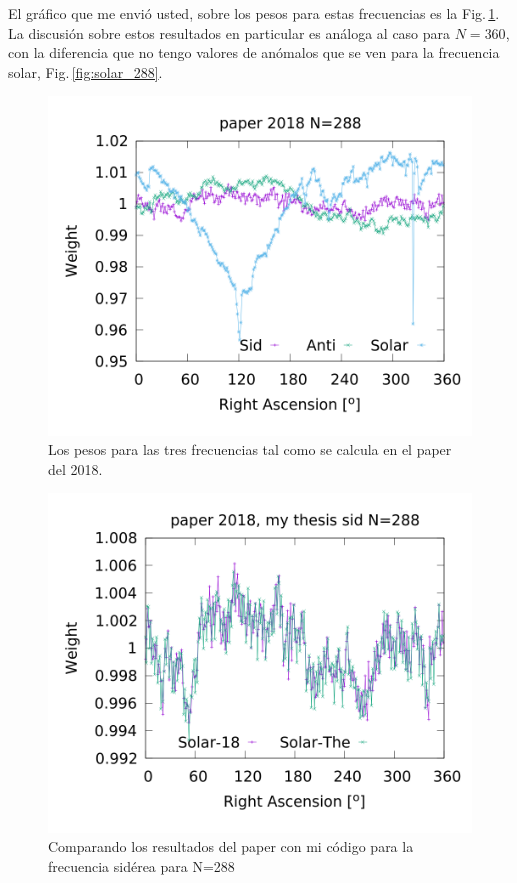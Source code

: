 	El gráfico que me envió usted, sobre los pesos para estas frecuencias es la Fig.\,\ref{fig:all_288_paper}. La discusión sobre estos resultados en particular es análoga al caso para $N=360$, con la diferencia que no tengo valores de anómalos que se ven para la frecuencia solar, Fig.\,\ref{fig:solar_288}.
	\begin{figure}[H]
	\centering
	\includegraphics[width=\linewidth]{Graficos/solar_anti_sid_paper2018_in_288.png}
	\caption{Los pesos para las tres frecuencias tal como se calcula en el paper del 2018.}
	\label{fig:all_288_paper}
	\end{figure}


	\begin{figure}[H]
	\centering
	\includegraphics[width=\linewidth]{Graficos/sidereal_my_and_paper_in_288.png}
	\caption{Comparando los resultados del paper con mi código para la frecuencia sidérea para N=288}
	\label{fig:sidereal_288}
	\end{figure}


